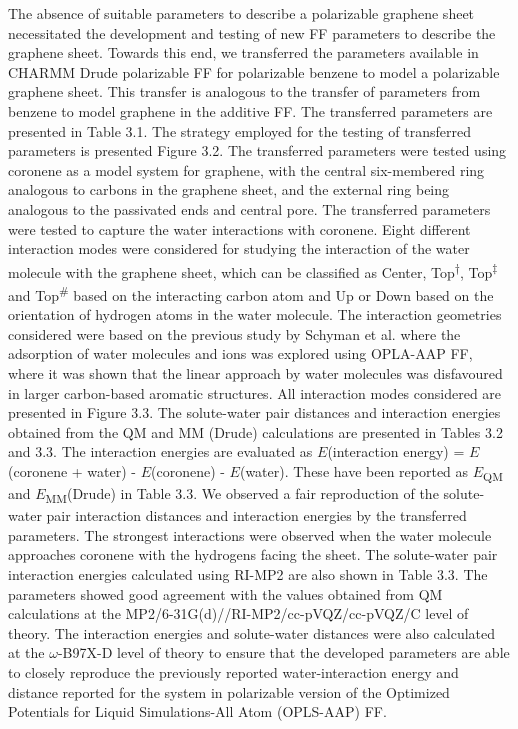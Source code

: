 The absence of suitable parameters to describe a polarizable graphene sheet necessitated the development and testing of new FF parameters to describe the graphene sheet. Towards this end, we transferred the parameters available in CHARMM Drude polarizable FF for polarizable benzene to model a polarizable graphene sheet. This transfer is analogous to the transfer of parameters from benzene to model graphene in the additive FF. The transferred parameters are presented in Table 3.1. The strategy employed for the testing of transferred parameters is presented Figure 3.2. The transferred parameters were tested using coronene as a model system for graphene, with the central six-membered ring analogous to carbons in the graphene sheet, and the external ring being analogous to the passivated ends and central pore. The transferred parameters were tested to capture the water interactions with coronene. Eight different interaction modes were considered for studying the interaction of the water molecule with the graphene sheet, which can be classified as Center, Top\textsuperscript{$\dagger$}, Top\textsuperscript{$\ddagger$} and Top\textsuperscript{\#} based on the interacting carbon atom and Up or Down based on the orientation of hydrogen atoms in the water molecule. The interaction geometries considered were based on the previous study by Schyman et al. where the adsorption of water molecules and ions was explored using OPLA-AAP FF,\supercite{schyman_exploring_2013} where it was shown that the linear approach by water molecules was disfavoured in larger carbon-based aromatic structures. All interaction modes considered are presented in Figure 3.3. The solute-water pair distances and interaction energies obtained from the QM and MM (Drude) calculations are presented in Tables 3.2 and 3.3. The interaction energies are evaluated as $E$(interaction energy) = $E$(coronene + water) - $E$(coronene) - $E$(water). These have been reported as $E$\textsubscript{QM} and $E$\textsubscript{MM}(Drude) in Table 3.3. We observed a fair reproduction of the solute-water pair interaction distances and interaction energies by the transferred parameters. The strongest interactions were observed when the water molecule approaches coronene with the hydrogens facing the sheet. The solute-water pair interaction energies calculated using RI-MP2 are also shown in Table 3.3. The parameters showed good agreement with the values obtained from QM calculations at the MP2/6-31G(d)//RI-MP2/cc-pVQZ/cc-pVQZ/C level of theory. The interaction energies and solute-water distances were also calculated at the $\omega$-B97X-D level of theory to ensure that the developed parameters are able to closely reproduce the previously reported water-interaction energy and distance reported for the system in polarizable version of the Optimized Potentials for Liquid Simulations-All Atom (OPLS-AAP) FF.

